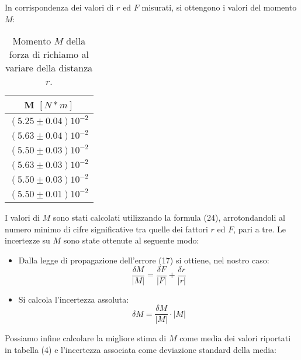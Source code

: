 In corrispondenza dei valori di $r$ ed $F$ misurati, si ottengono i valori del momento $M$:

\begin{table}[H]
	\centering
	\begin{tabular}{|c|}
		\hline
		\textbf{M $[N*m]$} \\
		\hline
		$(5.25\pm 0.04)10^{-2}$ \\
		$(5.63\pm 0.04)10^{-2}$ \\
		$(5.50\pm 0.03)10^{-2}$ \\
		$(5.63\pm 0.03)10^{-2}$ \\
		$(5.50\pm 0.03)10^{-2}$ \\
            $(5.50 \pm 0.01)10^{-2}$ \\
		\hline
	\end{tabular}
	\caption{Momento $M$ della forza di richiamo al variare della distanza $r$.}
	\label{tab:}
\end{table}

I valori di $M$ sono stati calcolati utilizzando la formula (24), arrotondandoli al numero minimo di cifre significative tra quelle dei fattori $r$ ed $F$, pari a tre. Le incertezze su $M$ sono state ottenute al seguente modo:
\begin{itemize}
    \item Dalla legge di propagazione dell'errore (17) si ottiene, nel nostro caso: 
    \begin{equation}
        \frac{\delta M}{|M|} = \frac{\delta F}{|F|} + \frac{\delta r}{|r|}
    \end{equation}
    \item Si calcola l'incertezza assoluta:
    \begin{equation}
        \delta M = \frac{\delta M}{|M|} \cdot |M|
    \end{equation}
\end{itemize}

Possiamo infine calcolare la migliore stima di $M$ come media dei valori riportati in tabella (4) e l'incertezza associata come deviazione standard della media:

